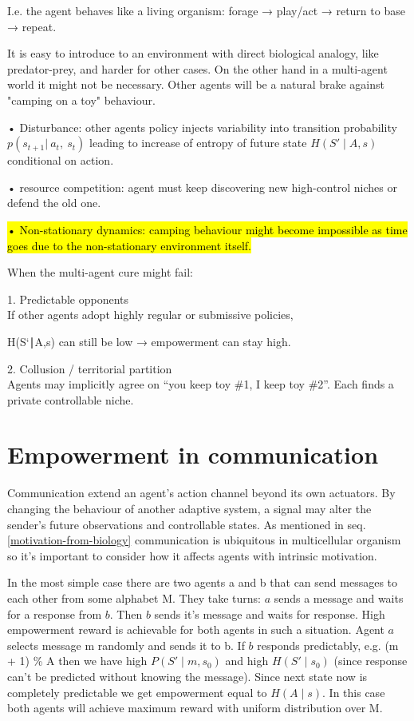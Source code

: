 I.e. the agent behaves like a living organism: forage → play/act → return to base → repeat.

It is easy to introduce to an environment with direct biological analogy, like predator-prey, and harder for other cases. On the other hand in a multi-agent world it might not be necessary. Other agents will be a natural brake against "camping on a toy" behaviour.

• Disturbance: other agents policy injects variability into transition probability $p(s_{t + 1}|\ a_{t},\ s_{t})$ leading to increase of entropy of future state $H(S' \mid A,s)$ conditional on action.

• resource competition: agent must keep discovering new high-control niches or defend the old one.

\hl{• Non-stationary dynamics: camping behaviour might become impossible as time goes due to the non-stationary environment itself.}

When the multi-agent cure might fail:

1. Predictable opponents\\
If other agents adopt highly regular or submissive policies,

H(S`∣A,s) can still be low → empowerment can stay high.

2. Collusion / territorial partition\\
Agents may implicitly agree on ``you keep toy \#1, I keep toy \#2''. Each finds a private controllable niche.

\section{Empowerment in communication}\label{empowerment-in-communication}

Communication extend an agent's action channel beyond its own actuators. By changing the behaviour of another adaptive system, a signal may alter the sender's future observations and controllable states. As mentioned in seq. \ref{motivation-from-biology} communication is ubiquitous in multicellular organism so it's important to consider how it affects agents with intrinsic motivation.

In the most simple case there are two agents a and b that can send messages to each other from some alphabet M. They take turns: $a$ sends a message and waits for a response from $b$. Then $b$ sends it's message and waits for response. High empowerment reward is achievable for both agents in such a situation. Agent $a$ selects message m randomly and sends it to b. If $b$ responds predictably, e.g. (m + 1) \% \textbar A\textbar{} then we have high $P(S' \mid m,s_0)$ and high $H(S' \mid s_0)$ (since response can't be predicted without knowing the message). Since next state now is completely predictable we get empowerment equal to $H(A \mid s)$. In this case both agents will achieve maximum reward with uniform distribution over M.

